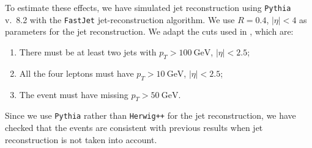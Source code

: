 \documentclass[twoside,english]{uiofysmaster}
\begin{document}
To estimate these effects, we have simulated jet reconstruction using {\tt Pythia} v.\ 8.2 \cite{Sjostrand:2014zea} with the {\tt FastJet} \cite{Cacciari:2011ma} jet-reconstruction algorithm. We use $R = 0.4$, $|\eta|<4$ as parameters for the jet reconstruction. We adapt the cuts used in \cite{Cheng:2009fw}, which are:
\begin{enumerate}
	\item There must be at least two jets with $p_T > 100~\mathrm{GeV}$, $|\eta|<2.5$;
	\item All the four leptons must have $p_T > 10~\mathrm{GeV}$, $|\eta|<2.5$;
	\item The event must have missing $p_T > 50~\mathrm{GeV}$.
\end{enumerate}
Since we use {\tt Pythia} rather than {\tt Herwig++} for the jet reconstruction, we have checked that the events are consistent with previous results when jet reconstruction is not taken into account. 
\end{document}
